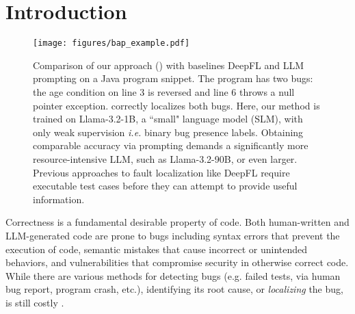 \section{Introduction}

\begin{figure}[t]
    \centering    \texttt{[image: figures/bap\_example.pdf]}
    \caption{Comparison of our approach \textit{\ourmethodlong{}} (\ourmethod{}) with baselines DeepFL and LLM prompting on a  Java program snippet. The program has two bugs: the age condition on line 3 is reversed and line 6 throws a null pointer exception. \ourmethod{} correctly localizes both bugs. Here, our method is trained on Llama-3.2-1B, a ``small" language model (SLM), with only weak supervision \textit{i.e.} binary bug presence labels. Obtaining comparable accuracy via prompting demands a significantly more resource-intensive LLM, such as Llama-3.2-90B, or even larger. Previous approaches to fault localization like DeepFL require executable test cases before they can attempt to provide useful information.}
    \label{fig:splash}
    \vspace{-0.1in}
\end{figure}

Correctness is a fundamental desirable property of code.
Both human-written and LLM-generated code are prone to bugs \cite{karampatsis2020often, jesse2023large} including
syntax errors that prevent the execution of code, semantic mistakes that cause incorrect or unintended behaviors, and vulnerabilities that compromise security in otherwise correct code.
While there are various methods for detecting bugs (e.g. failed tests, via human bug report, program crash, etc.), identifying its root cause, or \textit{localizing} the bug, is still costly \citep{vessey1985expertise, flsurvey}.



